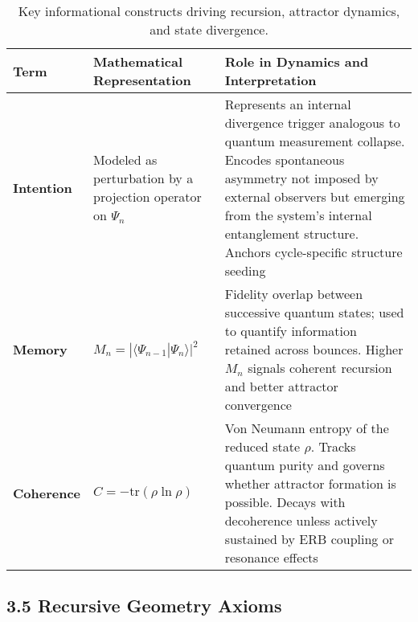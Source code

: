 \begin{table}[h!]
\centering
\begin{tabular}{>{\raggedright}p{3cm}>{\raggedright}p{6.5cm}>{\raggedright\arraybackslash}p{5cm}}
\toprule
\textbf{Term} & \textbf{Mathematical Representation} & \textbf{Role in Dynamics and Interpretation} \\
\midrule
\textbf{Intention} & Modeled as perturbation by a projection operator on $\Psi_n$ & 
Represents an internal divergence trigger analogous to quantum measurement collapse. Encodes spontaneous asymmetry not imposed by external observers but emerging from the system’s internal entanglement structure. Anchors cycle-specific structure seeding \\
\addlinespace
\textbf{Memory} & $M_n = |\langle \Psi_{n-1} | \Psi_n \rangle|^2$ & 
Fidelity overlap between successive quantum states; used to quantify information retained across bounces. Higher $M_n$ signals coherent recursion and better attractor convergence \cite{zurek2003decoherence} \\
\addlinespace
\textbf{Coherence} & $C = -\text{tr}(\rho \ln \rho)$ & 
Von Neumann entropy of the reduced state $\rho$. Tracks quantum purity and governs whether attractor formation is possible. Decays with decoherence unless actively sustained by ERB coupling or resonance effects \cite{nielsen2002quantum} \\
\bottomrule
\end{tabular}
\caption{Key informational constructs driving recursion, attractor dynamics, and state divergence.}
\end{table}

\subsection*{3.5 Recursive Geometry Axioms}

